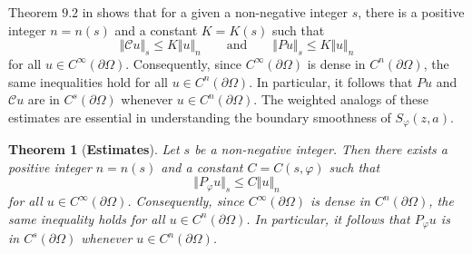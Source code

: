 \documentclass[11pt, reqno]{amsart}
\newtheorem{thm}{Theorem}[section]
\numberwithin{equation}{section}
\begin{document}
\medskip

Theorem $9.2$ in \cite{Be0} shows that for a given a non-negative integer $s$, there is a positive integer $n=n(s)$ and a constant $K=K(s)$ such that
    \[
    \Vert \mathcal{C}u\Vert_s\leq K\Vert u\Vert_n
    \quad\quad
    \text{and}
    \quad\quad
    \Vert Pu\Vert_s \leq K \Vert u\Vert_n
    \]
for all $u\in C^{\infty}(\partial\Omega)$. Consequently, since $C^{\infty}(\partial\Omega)$ is dense in $C^n(\partial\Omega)$, the same inequalities hold for all $u\in C^n(\partial\Omega)$. In particular, it follows that $Pu$ and $\mathcal{C}u$ are in $C^s(\partial\Omega)$ whenever $u\in C^n(\partial\Omega)$. The weighted analogs of these estimates are essential in understanding the boundary smoothness of $S_{\varphi}(z, a)$.

\begin{thm}[\textbf{Estimates}]
Let $s$ be a non-negative integer. Then there exists a positive integer $n=n(s)$ and a constant $C=C(s,\varphi)$ such that
\begin{equation}
\Vert P_{\varphi}u\Vert_s \leq C\Vert u\Vert_n
\end{equation}
for all $u\in C^{\infty}(\partial\Omega)$. Consequently, since $C^{\infty}(\partial\Omega)$ is dense in $C^n(\partial\Omega)$, the same inequality holds for all $u\in C^n(\partial\Omega)$. In particular, it follows that $P_{\varphi}u$ is in $C^s(\partial\Omega)$ whenever $u\in C^n(\partial\Omega)$.
\end{thm}
\end{document}
